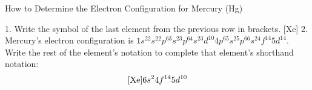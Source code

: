 \begin{center}
    How to Determine the Electron Configuration for Mercury (Hg)
    
    1. Write the symbol of the last element from the previous row in brackets. [Xe]
    2. Mercury's electron configuration is $1s^22s^22p^63s^23p^64s^23d^{10}4p^65s^25p^66s^24f^{14}5d^{14}$. Write the rest of the element's notation to complete that element's shorthand notation: \\
    
    \begin{align}
        \rm{[Xe]} 6s^24f^{14}5d^{10}
    \end{align}
\end{center}

\newpage
